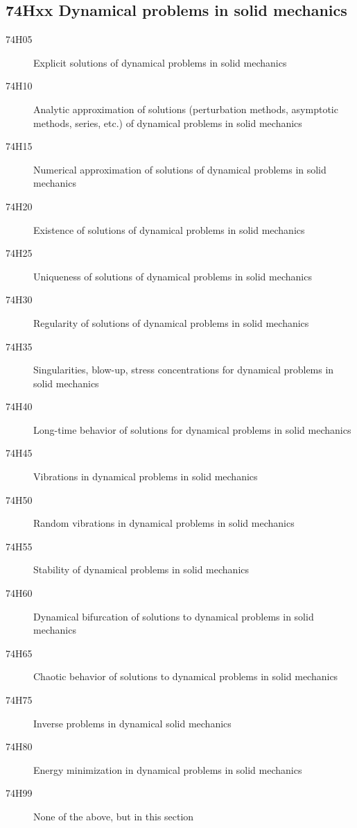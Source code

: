 \subsection*{74Hxx  Dynamical problems in solid mechanics }\label{74Hxx}
\begin{description}  
\item [74H05]\label{74H05} Explicit solutions of dynamical problems in solid mechanics
\item [74H10]\label{74H10} Analytic approximation of solutions (perturbation methods, asymptotic methods, series, etc.) of dynamical problems in solid mechanics
\item [74H15]\label{74H15} Numerical approximation of solutions of dynamical problems in solid mechanics
\item [74H20]\label{74H20} Existence of solutions of dynamical problems in solid mechanics
\item [74H25]\label{74H25} Uniqueness of solutions of dynamical problems in solid mechanics
\item [74H30]\label{74H30} Regularity of solutions of dynamical problems in solid mechanics
\item [74H35]\label{74H35} Singularities, blow-up, stress concentrations for dynamical problems in solid mechanics
\item [74H40]\label{74H40} Long-time behavior of solutions for dynamical problems in solid mechanics
\item [74H45]\label{74H45} Vibrations in dynamical problems in solid mechanics
\item [74H50]\label{74H50} Random vibrations in dynamical problems in solid mechanics
\item [74H55]\label{74H55} Stability of dynamical problems in solid mechanics
\item [74H60]\label{74H60} Dynamical bifurcation of solutions to dynamical problems in solid mechanics
\item [74H65]\label{74H65} Chaotic behavior of solutions to dynamical problems in solid mechanics
\item [74H75]\label{74H75} Inverse problems in dynamical solid mechanics
\item [74H80]\label{74H80} Energy minimization in dynamical problems in solid mechanics
\item [74H99]\label{74H99} None of the above, but in this section
\end{description}
